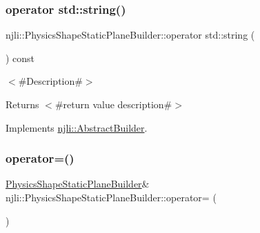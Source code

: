 \subsubsection{\texorpdfstring{operator std\+::string()}{operator std::string()}}
{\footnotesize\ttfamily njli\+::\+Physics\+Shape\+Static\+Plane\+Builder\+::operator std\+::string (\begin{DoxyParamCaption}{ }\end{DoxyParamCaption}) const\hspace{0.3cm}{\ttfamily [virtual]}}

$<$\#\+Description\#$>$

\begin{DoxyReturn}{Returns}
$<$\#return value description\#$>$ 
\end{DoxyReturn}


Implements \mbox{\hyperlink{classnjli_1_1_abstract_builder_a3e6e553e06d1ca30517ad5fb0bd4d000}{njli\+::\+Abstract\+Builder}}.

\mbox{\label{classnjli_1_1_physics_shape_static_plane_builder_a73fe0c31f106a69bd158632454edd637}} 
\subsubsection{\texorpdfstring{operator=()}{operator=()}}
{\footnotesize\ttfamily \mbox{\hyperlink{classnjli_1_1_physics_shape_static_plane_builder}{Physics\+Shape\+Static\+Plane\+Builder}}\& njli\+::\+Physics\+Shape\+Static\+Plane\+Builder\+::operator= (\begin{DoxyParamCaption}\item[{const \mbox{\hyperlink{classnjli_1_1_physics_shape_static_plane_builder}{Physics\+Shape\+Static\+Plane\+Builder}} \&}]{ }\end{DoxyParamCaption})\hspace{0.3cm}{\ttfamily [protected]}}

\mbox{\label{classnjli_1_1_physics_shape_static_plane_builder_ab56fb6007e7cb72fee413108b67bb948}} 
